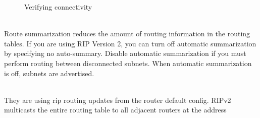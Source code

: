 \documentclass[../EngineeringJournal_CDavis.tex]{subfiles}
\begin{document}
\begin{figure}[!b]\centering
{}\par
{}\hfill 
{}\par
\caption{Verifying connectivity}\label{VerifyRip8}
\end{figure}


\clearpage



\\
Route summarization reduces the amount of routing information in the routing tables.  If you are using RIP Version 2, you can turn off automatic summarization by specifying no auto-summary. Disable automatic summarization if you must perform routing between disconnected subnets. When automatic summarization is off, subnets are advertised.

\\
They are using rip routing updates from the router default config. RIPv2 multicasts the entire routing table to all adjacent routers at the address 

\end{document}
